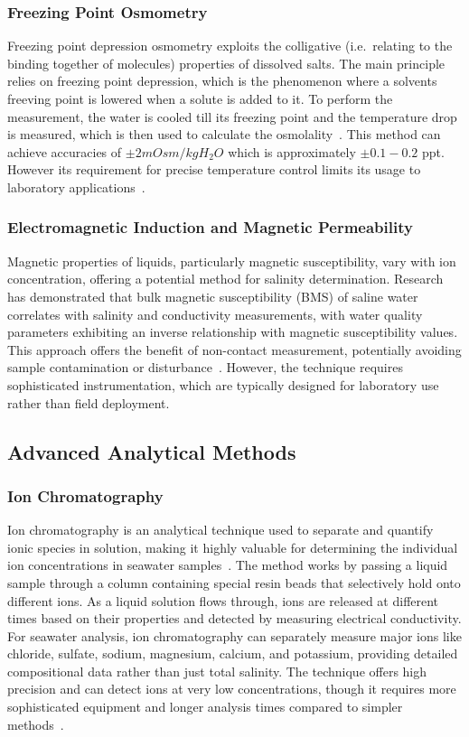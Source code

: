 \subsubsection{Freezing Point Osmometry}
Freezing point depression osmometry exploits the colligative (i.e.~relating to the binding together of molecules) properties of dissolved salts.
The main principle relies on freezing point depression, which is the phenomenon where a solvents freeving point is lowered when a solute is added to it.
To perform the measurement, the water is cooled till its freezing point and the temperature drop is measured, which is then used to calculate the osmolality~\cite{freeze_abele}.
This method can achieve accuracies of $\pm2 mOsm/kg H_{2}O$ which is approximately $\pm0.1-0.2$ \gls{ppt}. However its requirement for precise temperature control limits its usage to laboratory applications~\cite{freezing_accuracy}.


\subsubsection{Electromagnetic Induction and Magnetic Permeability}
Magnetic properties of liquids, particularly magnetic susceptibility, vary with ion concentration, offering a potential method for salinity determination.
Research has demonstrated that bulk magnetic susceptibility (BMS) of saline water correlates with salinity and conductivity measurements, with water quality parameters exhibiting an inverse relationship with magnetic susceptibility values.
This approach offers the benefit of non-contact measurement, potentially avoiding sample contamination or disturbance~\cite{rana_magnetic_2021}.
However, the technique requires sophisticated instrumentation, which are typically designed for laboratory use rather than field deployment. 



\subsection{Advanced Analytical Methods}
\subsubsection{Ion Chromatography}
Ion chromatography is an analytical technique used to separate and quantify ionic species in solution, making it highly valuable for determining the individual ion concentrations in seawater samples~\cite{ion_chromatography}.
The method works by passing a liquid sample through a column containing special resin beads that selectively hold onto different ions.
As a liquid solution flows through, ions are released at different times based on their properties and detected by measuring electrical conductivity.
For seawater analysis, ion chromatography can separately measure major ions like chloride, sulfate, sodium, magnesium, calcium, and potassium, providing detailed compositional data rather than just total salinity. 
The technique offers high precision and can detect ions at very low concentrations, though it requires more sophisticated equipment and longer analysis times compared to simpler methods~\cite{gros_ionic_2008}.

